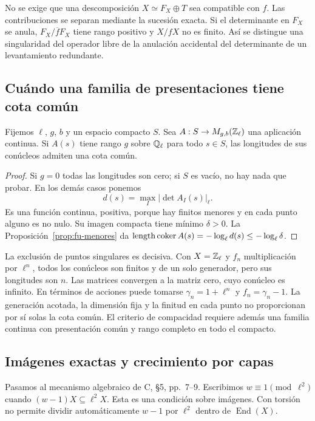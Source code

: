 No se exige que una descomposición $X\simeq F_X\oplus T$
sea compatible con $f$. Las contribuciones se separan mediante
la sucesión exacta. Si el determinante en $F_X$ se anula,
$F_X/\overline f F_X$ tiene rango positivo y $X/fX$ no es finito.
Así se distingue una singularidad del operador libre de la
anulación accidental del determinante de un levantamiento redundante.

\subsection{Cuándo una familia de presentaciones tiene cota común}

\begin{proposicion}
\label{prop:fu-compacidad}
Fijemos $\ell$, $g$, $b$ y un espacio compacto $S$.
Sea $A:S\to M_{g,b}(\mathbb{Z}_\ell)$ una aplicación continua.
Si $A(s)$ tiene rango $g$ sobre $\mathbb{Q}_\ell$ para todo $s\in S$,
las longitudes de sus conúcleos admiten una cota común.
\end{proposicion}

\begin{proof}
Si $g=0$ todas las longitudes son cero; si $S$ es vacío,
no hay nada que probar. En los demás casos ponemos
\[
 d(s)=\max_I|\det A_I(s)|_\ell.
\]
Es una función continua, positiva, porque hay finitos menores
y en cada punto alguno es no nulo. Su imagen compacta tiene
mínimo $\delta>0$. La Proposición~\ref{prop:fu-menores} da
$\operatorname{length}\operatorname{coker}A(s)=-\log_\ell d(s)
\le-\log_\ell\delta$.
\end{proof}

La exclusión de puntos singulares es decisiva. Con $X=\mathbb{Z}_\ell$
y $f_n$ multiplicación por $\ell^n$, todos los conúcleos son
finitos y de un solo generador, pero sus longitudes son $n$.
Las matrices convergen a la matriz cero, cuyo conúcleo es infinito.
En términos de acciones puede tomarse $\gamma_n=1+\ell^n$ y
$f_n=\gamma_n-1$. La generación acotada, la dimensión fija y
la finitud en cada punto no proporcionan por sí solas la cota común.
El criterio de compacidad requiere además una familia continua
con presentación común y rango completo en todo el compacto.

\subsection{Imágenes exactas y crecimiento por capas}

Pasamos al mecanismo algebraico de C, §5, pp.~7--9.
Escribimos $w\equiv1\pmod{\ell^2}$ cuando
$(w-1)X\subseteq\ell^2X$. Esta es una condición sobre imágenes.
Con torsión no permite dividir automáticamente $w-1$ por
$\ell^2$ dentro de $\operatorname{End}(X)$.

